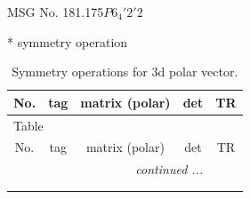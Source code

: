 \documentclass[fleqn,8pt]{jsarticle}
\begin{document}
\setcounter{MaxMatrixCols}{32}

\renewcommand{\tablename}{Table~}
\renewcommand{\figurename}{Figure~}
\begin{center}
\LARGE
MSG No. 181.175\quad$P6_{4}'2'2$
\end{center}
* symmetry operation
\renewcommand{\arraystretch}{1.3}
\begin{longtable}{ccccc}
\caption{Symmetry operations for 3d polar vector.}
 \\
 \hline \hline
No. & tag & matrix (polar) & det & TR \\ \hline \endfirsthead

\multicolumn{4}{l}{\tablename\ \thetable{}} \\
 \hline \hline
No. & tag & matrix (polar) & det & TR \\ \hline \endhead

 \hline \hline
\multicolumn{4}{r}{\footnotesize\it continued ...} \\ \endfoot

 \hline \hline
\multicolumn{4}{r}{} \\ \endlastfoot


\end{longtable}
\end{document}
